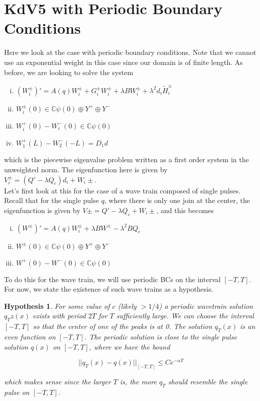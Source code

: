 \documentclass[12pt]{article}
\def\C{{\mathbb C}}
\newtheorem{hypothesis}{Hypothesis}
\begin{document}
\section*{KdV5 with Periodic Boundary Conditions}

Here we look at the case with periodic boundary conditions. Note that we cannot use an exponential weight in this case since our domain is of finite length. As before, we are looking to solve the system

\begin{enumerate}[(i)]
\item $(W_i^\pm)' = A(q) W_i^\pm + G_i^\pm W_i^\pm + \lambda B W_i^\pm + \lambda^2 d_i \tilde{H}_i^\pm$
\item $W_i^\pm(0) \in \C \psi(0) \oplus Y^+ \oplus Y^-$
\item $W_i^+(0) - W_i^-(0) \in \C \psi(0) $
\item $W_1^+(L) - W_2^-(-L) = D_1 d $
\end{enumerate}

which is the piecewise eigenvalue problem written as a first order system in the unweighted norm. The eigenfunction here is given by $V_i^\pm = (Q' - \lambda Q_c)d_i + W_i\pm$.\\

Let's first look at this for the case of a wave train composed of single pulses. Recall that for the single pulse $q$, where there is only one join at the center, the eigenfunction is given by $V\pm = Q' - \lambda Q_c + W_i\pm$, and this becomes

\begin{enumerate}[(i)]
\item $(W^\pm)' = A(q) W_i^\pm + \lambda B W^\pm - \lambda^2 B Q_c$
\item $W^\pm(0) \in \C \psi(0) \oplus Y^+ \oplus Y^-$
\item $W^+(0) - W^-(0) \in \C \psi(0) $
\end{enumerate}

To do this for the wave train, we will use periodic BCs on the interval $[-T, T]$. For now, we state the existence of such wave trains as a hypothesis.

\begin{hypothesis}\label{qpexists}
For some value of $c$ (likely $> 1/4$) a periodic wavetrain solution $q_Tz(x)$ exists with period $2T$ for $T$ sufficiently large. We can choose the interval $[-T,T]$ so that the center of one of the peaks is at 0. The solution $q_T(x)$ is an even function on $[-T, T]$. The periodic solution is close to the single pulse solution $q(x)$ on $[-T, T]$, where we have the bound 

\[
||q_T(x) - q(x)||_{[-T, T]} \leq C e^{-\alpha T}
\]

which makes sense since the larger $T$ is, the more $q_T$ should resemble the single pulse on $[-T, T]$.
\end{hypothesis}
\end{document}
